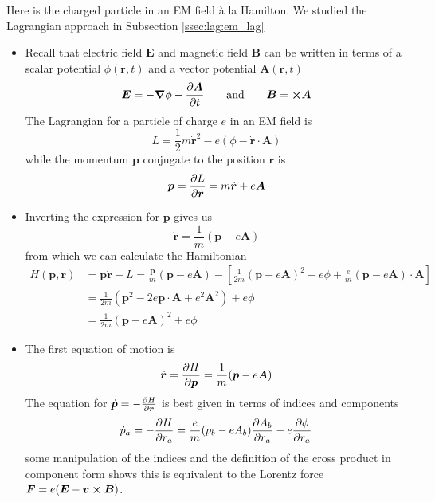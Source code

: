 \documentclass[11pt, a4paper]{article}
\newcommand{\eqtext}[1]{\qquad \text{#1} \qquad}
\newcommand{\bdot}[1]{\dot{\bm{#1}}} %
\begin{document}
\smallskip
Here is the charged particle in an EM field \`{a} la Hamilton. We studied the Lagrangian approach in Subsection \ref{ssec:lag:em_lag}
\begin{itemize}
	\item Recall that electric field $ \bm{E} $ and magnetic field $ \bm{B} $ can be written in terms of a scalar potential $ \phi(\bm{r}, t) $ and a vector potential $ \bm{A}(\bm{r}, t) $
	\begin{equation*}
		 \bm{E} = -\grad{\phi} - \pdv{\bm{A}}{t} \eqtext{and} \bm{B} = \cross \bm{A} 
	\end{equation*} 
	The Lagrangian for a particle of charge $ e $ in an EM field is
	\begin{equation*}
		L = \frac{1}{2}m \bdot{r}^{2} - e(\phi - \bdot{r}\cdot \bm{A})
	\end{equation*}
	while the momentum $ \bm{p} $ conjugate to the position $ \bm{r} $ is
	\begin{equation*}
		\bm{p} = \pdv{L}{\bdot{r}} = m \bdot{r} + e\bm{A}
	\end{equation*}
	
	\item Inverting the expression for $ \bm{p} $ gives us
	\begin{equation*}
		\bdot{r} = \frac{1}{m}(\bm{p}-e\bm{A})
	\end{equation*}
	from which we can calculate the Hamiltonian
	\begin{align*}
		H(\bm{p}, \bm{r}) &= \bm{p} \bdot{r} - L = \frac{\bm{p} }{m}(\bm{p} - e\bm{A}) - \left[\frac{1}{2m} (\bm{p} - e\bm{A})^{2} - e \phi + \frac{e}{m}(\bm{p} - e\bm{A})\cdot \bm{A} \right]\\
		&=\frac{1}{2m}(\bm{p}^{2} - 2e \bm{p}\cdot \bm{A} + e^{2}\bm{A}^{2}) + e \phi\\
		&=\frac{1}{2m}(\bm{p} - e \bm{A})^{2} + e \phi
	\end{align*}
	
	\item The first equation of motion is
	\begin{equation*}
		\bdot{r} = \pdv{H}{\bm{p}} = \frac{1}{m}(\bm{p} - e \bm{A})
	\end{equation*}
	The equation for $ \bdot{p} = - \pdv{H}{\bm{r}} $ is best given in terms of indices and components
	\begin{equation*}
		\dot{p}_{a} = - \pdv{H}{r_{a}} = \frac{e}{m}(p_{b} - eA_{b}) \pdv{A_{b}}{r_{a}} - e \pdv{\phi}{r_{a}}
	\end{equation*}
	some manipulation of the indices and the definition of the cross product in component form shows this is equivalent to the Lorentz force $ \bm{F} = e(\bm{E} - \bm{v} \cross \bm{B}) $.
\end{itemize}
\end{document}
